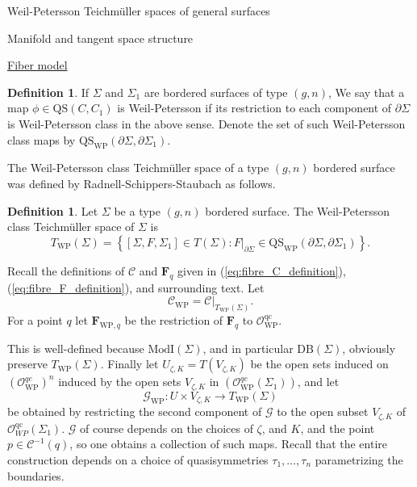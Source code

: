 \documentclass[12pt]{amsart}
\newcommand{\riem}{\Sigma}  %
\theoremstyle{plain}
\theoremstyle{definition}
\newtheorem{definition}[theorem]{Definition}
\theoremstyle{remark}
\numberwithin{equation}{section} %
\numberwithin{figure}{section} %
\begin{document}
\begin{section}{Weil-Petersson Teichm\"uller spaces of general surfaces}
\begin{subsection}{Manifold and tangent space structure}
\begin{subsubsection}{{\underline{Fiber model}}}
\begin{definition}
 If $\riem$ and $\riem_1$ are bordered surfaces of type $(g,n)$, 
 We say that a map $\phi \in \mathrm{QS}(C,C_1)$ is Weil-Petersson if its restriction to each component of $\partial \riem$ is Weil-Petersson class in the above sense. Denote the set of such Weil-Petersson class maps by $\mathrm{QS}_{\mathrm{WP}}(\partial \riem,\partial \riem_1)$. 
\end{definition}


The Weil-Petersson class Teichm\"uller space of a type $(g,n)$ bordered surface was defined by Radnell-Schippers-Staubach as follows. 
\begin{definition}  \label{de:WP_Teich_space_us_first_version} Let $\riem$ be a type $(g,n)$ bordered surface.  The Weil-Petersson class Teichm\"uller space of $\riem$ is 
 \[  T_{\mathrm{WP}}(\riem) = \left\{ [\riem,F,\riem_1] \in T(\riem) : \left. F \right|_{\partial \riem} \in \mathrm{QS}_{\mathrm{WP}}(\partial \riem,\partial \riem_1)    \right\}.  \]
\end{definition}  

Recall the definitions of $\mathcal{C}$ and $\mathbf{F}_q$ given in (\ref{eq:fibre_C_definition}), (\ref{eq:fibre_F_definition}), and surrounding text. 
Let 
\[  \mathcal{C}_{\mathrm{WP}} = \left. \mathcal{C} \right|_{T_{\mathrm{WP}}(\riem)}.  \]  
For a point $q$ let $\mathbf{F}_{\mathrm{WP},q}$ be the restriction of $\mathbf{F}_q$ to $\mathcal{O}_{\mathrm{WP}}^{\mathrm{qc}}$.
 
This is well-defined because $\mathrm{ModI}(\riem)$, and in particular $\mathrm{DB}(\riem)$, obviously preserve $T_{\mathrm{WP}}(\riem)$.
Finally let $U_{\zeta,K}=T(V_{\zeta,K})$ be the open sets induced on $\left(\mathcal{O}^{qc}_{\mathrm{WP}}\right)^n$ induced by the open sets $V_{\zeta,K}$ in $\left(\mathcal{O}^{qc}_{\mathrm{WP}}(\riem_1)\right)$, and let 
\[ \mathcal{G}_{\mathrm{WP}}:U \times V_{\zeta,K} \rightarrow T_{\mathrm{WP}}(\riem) \]
be obtained by restricting the second component of $\mathcal{G}$ to the open subset $V_{\zeta,K}$ of $\mathcal{O}^{\mathrm{qc}}_{WP}(\riem_1)$. $\mathcal{G}$ of course depends on the choices of $\zeta$, and $K$, and the point $p \in \mathcal{C}^{-1}(q)$, so one obtains a collection of such maps.  Recall that the entire construction depends on a choice of quasisymmetries $\tau_1,\ldots,\tau_n$ parametrizing the boundaries. 


\end{subsubsection}
\end{subsection}
\end{section}
\end{document}
